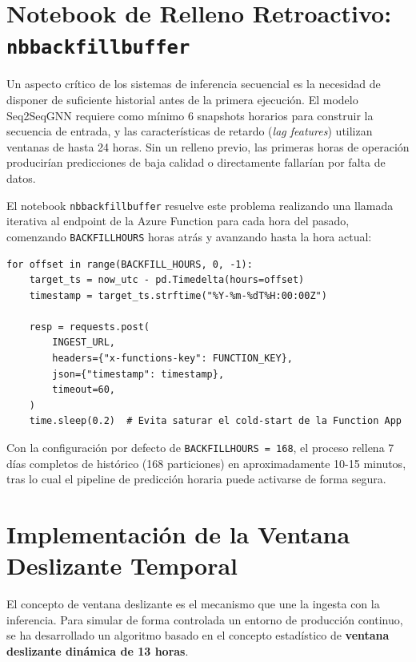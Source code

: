\documentclass[12pt,oneside,a4paper]{report}
\renewcommand{\_}{\textunderscore\allowbreak}
\begin{document}
\section{Notebook de Relleno Retroactivo: \texttt{nb\_backfill\_buffer}}
\label{sec:nb_backfill}

Un aspecto crítico de los sistemas de inferencia secuencial es la necesidad de disponer de suficiente historial antes de la primera ejecución. El modelo Seq2SeqGNN requiere como mínimo 6 snapshots horarios para construir la secuencia de entrada, y las características de retardo (\textit{lag features}) utilizan ventanas de hasta 24 horas. Sin un relleno previo, las primeras horas de operación producirían predicciones de baja calidad o directamente fallarían por falta de datos.

El notebook \texttt{nb\_backfill\_buffer} resuelve este problema realizando una llamada iterativa al endpoint de la Azure Function para cada hora del pasado, comenzando \texttt{BACKFILL\_HOURS} horas atrás y avanzando hasta la hora actual:

\begin{lstlisting}[style=pystyle, caption={Relleno retroactivo mediante llamadas iterativas a la Azure Function.}]
for offset in range(BACKFILL_HOURS, 0, -1):
    target_ts = now_utc - pd.Timedelta(hours=offset)
    timestamp = target_ts.strftime("%Y-%m-%dT%H:00:00Z")

    resp = requests.post(
        INGEST_URL,
        headers={"x-functions-key": FUNCTION_KEY},
        json={"timestamp": timestamp},
        timeout=60,
    )
    time.sleep(0.2)  # Evita saturar el cold-start de la Function App
\end{lstlisting}

Con la configuración por defecto de \texttt{BACKFILL\_HOURS = 168}, el proceso rellena 7 días completos de histórico (168 particiones) en aproximadamente 10-15 minutos, tras lo cual el pipeline de predicción horaria puede activarse de forma segura.

\section{Implementación de la Ventana Deslizante Temporal}
\label{sec:ventana_deslizante}

El concepto de ventana deslizante es el mecanismo que une la ingesta con la inferencia. Para simular de forma controlada un entorno de producción continuo, se ha desarrollado un algoritmo basado en el concepto estadístico de \textbf{ventana deslizante dinámica de 13 horas}.
\end{document}
